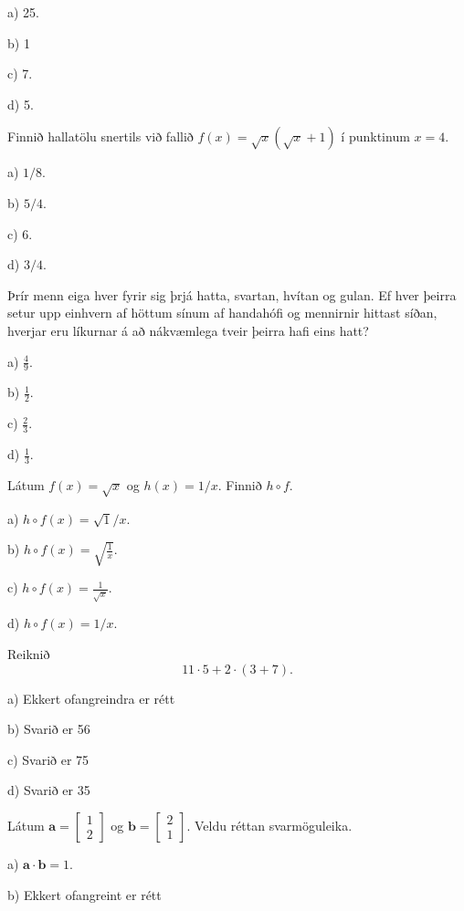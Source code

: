 a) 25.

b) 1

c) 7.

d) 5. %


\item Finnið hallatölu snertils við fallið $f(x) = \sqrt x
\left( \sqrt{x} + 1\right)$ í punktinum $x=4$.

a) $1/8$.

b) $5/4$. %

c) $6$.

d) $3/4$.


\item Þrír menn eiga hver fyrir sig þrjá hatta, svartan, hvítan og gulan. Ef hver þeirra setur upp einhvern af höttum sínum af handahófi og mennirnir hittast síðan, hverjar eru líkurnar á að nákvæmlega tveir þeirra hafi eins hatt?

a) $ \frac{4}{9}$.

b) $ \frac{1}{2}$.

c) $ \frac{2}{3}$. %

d) $ \frac{1}{3}$.


\item Látum $f(x)=\sqrt x$ og $h(x)=1/x$. Finnið $h\circ f$.

a) $h \circ f(x) = \sqrt{1}/x$.

b) $h \circ f(x) = \sqrt{\frac 1x}$.

c) $h\circ f(x) = \frac{1}{\sqrt x}$. %

d) $h \circ f(x) = 1/x$.


\item Reiknið
$$
11 \cdot 5+2 \cdot  \left ( 3+7 \right ) .
$$
\newpage

a) Ekkert ofangreindra er rétt

b) Svarið er 56

c) Svarið er 75 %

d) Svarið er 35


\item Látum $ \mathbf{a} =
\left[
\begin{matrix}
1\\
2
\end{matrix}
\right]
$
og
$
\mathbf{b} =
\left[
\begin{matrix}
2\\
1
\end{matrix}
\right]
$.
Veldu réttan svarmöguleika.

a) $ \mathbf{a} \cdot \mathbf{b} = 1$.

b) Ekkert ofangreint er rétt

